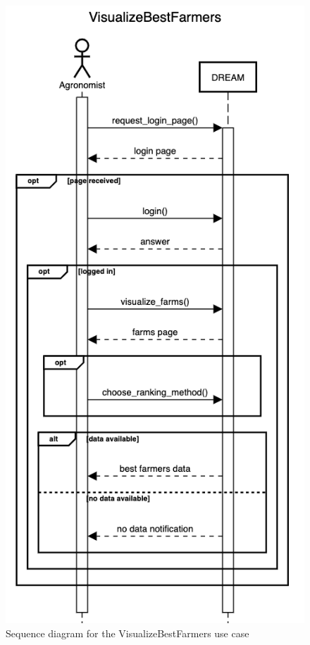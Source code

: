 \documentclass{article}
\begin{document}
\begin{figure}[h]
    \centering
	\includegraphics[scale=0.5]{sequence_diagrams/VisualizeBestFarmers}
    \caption{Sequence diagram for the VisualizeBestFarmers use case}
\end{figure}
\end{document}
